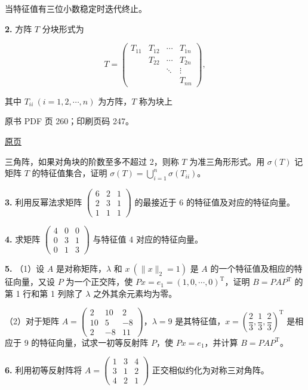当特征值有三位小数稳定时迭代终止。

\textbf{2.} 方阵 \(T\) 分块形式为

\[
T=\begin{pmatrix}
T_{11}&T_{12}&\cdots&T_{1n}\\
&T_{22}&\cdots&T_{2n}\\
&&\ddots&\vdots\\
&&&T_{nn}
\end{pmatrix},
\]

其中 \(T_{ii}\ (i=1,2,\cdots,n)\) 为方阵，\(T\) 称为块上

\clearpage

原书 PDF 页 260；印刷页码 247。

\href{source-images/pdf-260.jpeg}{原页}

三角阵，如果对角块的阶数至多不超过 2，则称 \(T\) 为准三角形形式。用 \(\sigma(T)\) 记矩阵 \(T\) 的特征值集合，证明 \(\sigma(T)=\displaystyle\bigcup_{i=1}^{n}\sigma(T_{ii})\)。

\textbf{3.} 利用反幂法求矩阵 \(\begin{pmatrix}6&2&1\\2&3&1\\1&1&1\end{pmatrix}\) 的最接近于 6 的特征值及对应的特征向量。

\textbf{4.} 求矩阵 \(\begin{pmatrix}4&0&0\\0&3&1\\0&1&3\end{pmatrix}\) 与特征值 4 对应的特征向量。

\textbf{5.} （1）设 \(A\) 是对称矩阵，\(\lambda\) 和 \(x\ (\|x\|_2=1)\) 是 \(A\) 的一个特征值及相应的特征向量，又设 \(P\) 为一个正交阵，使 \(Px=e_1=(1,0,\cdots,0)^{\mathrm T}\)，证明 \(B=PAP^{\mathrm T}\) 的第 1 行和第 1 列除了 \(\lambda\) 之外其余元素均为零。

（2）对于矩阵 \(A=\begin{pmatrix}2&10&2\\10&5&-8\\2&-8&11\end{pmatrix}\)，\(\lambda=9\) 是其特征值，\(x=\left(\dfrac23,\dfrac13,\dfrac23\right)^{\mathrm T}\) 是相应于 9 的特征向量，试求一初等反射阵 \(P\)，使 \(Px=e_1\)，并计算 \(B=PAP^{\mathrm T}\)。

\textbf{6.} 利用初等反射阵将 \(A=\begin{pmatrix}1&3&4\\3&1&2\\4&2&1\end{pmatrix}\) 正交相似约化为对称三对角阵。

